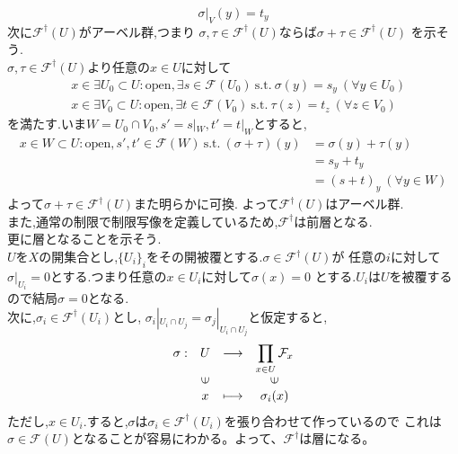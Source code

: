 \documentclass[dvipdfmx,a4paper,11pt]{jsbook}
\begin{document}
{\begin{equation*}
  \sigma|_{V}(y)=t_{y}
\end{equation*}
次に$\mathcal{F}^{\dagger}(U)$がアーベル群,つまり
$\sigma,\tau \in \mathcal{F}^{\dagger}(U)$ならば$\sigma+\tau \in \mathcal{F}^{\dagger}(U)$
を示そう.\\
$\sigma,\tau \in \mathcal{F}^{\dagger}(U)$より任意の$x\in U$に対して
\begin{align*}
  &x\in \exists U_{0} \subset U:\mathrm{open},\exists s \in \mathcal{F}(U_{0})\ \mathrm{s.t.}\ 
  \sigma(y) = s_{y}\ (\forall y \in U_{0})\\
  &x\in \exists V_{0} \subset U:\mathrm{open},\exists t \in \mathcal{F}(V_{0})\ \mathrm{s.t.}\ 
  \tau(z) = t_{z}\ (\forall z \in V_{0}) 
\end{align*}
を満たす.いま$W = U_{0} \cap V_{0},s' = s|_{W},t' = t|_{W}$とすると,
\begin{align*}
  x\in W \subset U:\mathrm{open}, s',t' \in \mathcal{F}(W)\ \mathrm{s.t.}\ 
  (\sigma + \tau)(y) 
  &= \sigma(y) + \tau(y)\\
  &= s_{y} + t_{y}\\
  &= (s + t)_{y} \ (\forall y \in W)
\end{align*}
よって$\sigma + \tau \in \mathcal{F}^{\dagger}(U)$また明らかに可換.
よって$\mathcal{F}^{\dagger}(U)$はアーベル群.\\
また,通常の制限で制限写像を定義しているため,$\mathcal{F}^{\dagger}$は前層となる.\\
更に層となることを示そう.\\
$U$を$X$の開集合とし,$\{U_{i}\}_{i}$をその開被覆とする.$\sigma\in \mathcal{F}^{\dagger}(U)$が
任意の$i$に対して$\sigma|_{U_{i}} = 0$とする.つまり任意の$x \in U_{i}$に対して$\sigma(x) = 0$
とする.$U_{i}$は$U$を被覆するので結局$\sigma = 0$となる.\\
次に,$\sigma_{i} \in \mathcal{F}^{\dagger}(U_{i})$とし,
$\sigma_{i}|_{U_{i} \cap U_{j}} = \sigma_{j}|_{U_{i} \cap U_{j}}$と仮定すると,
$$
  \begin{array}{rccc}
    \sigma :& U & \longrightarrow &\displaystyle \prod_{x\in U}\mathcal{F}_{x} \\
                                        & \rotatebox{90}{$\in$}    &                 & \rotatebox{90}{$\in$}    \\
                                        & x      & \longmapsto     & \sigma_{i}(x)
  \end{array}
$$
ただし,$x\in U_{i}$.すると,$\sigma$は$\sigma_{i}\in \mathcal{F}^{\dagger}(U_{i})$を張り合わせて作っているので
これは$\sigma \in \mathcal{F}(U)$となることが容易にわかる。よって、$\mathcal{F}^{\dagger}$は層になる。
}
\end{document}

